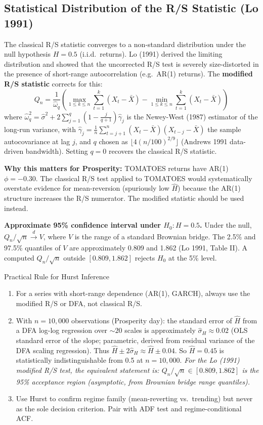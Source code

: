 \documentclass[12pt,a4paper,openany]{report}
\theoremstyle{definition}
\begin{document}
\subsection{Statistical Distribution of the R/S Statistic (Lo 1991)}

The classical R/S statistic converges to a non-standard distribution under the null hypothesis $H = 0.5$ (i.i.d.\ returns). Lo (1991) derived the limiting distribution and showed that the uncorrected R/S test is severely size-distorted in the presence of short-range autocorrelation (e.g.\ AR(1) returns). The \textbf{modified R/S statistic} corrects for this:
\[
  Q_n = \frac{1}{\hat{\omega}_q} \left(\max_{1 \leq k \leq n} \sum_{t=1}^k (X_t - \bar{X}) - \min_{1 \leq k \leq n} \sum_{t=1}^k (X_t - \bar{X})\right)
\]
where $\hat{\omega}_q^2 = \hat{\sigma}^2 + 2\sum_{j=1}^q \left(1 - \frac{j}{q+1}\right)\hat{\gamma}_j$ is the Newey-West (1987) estimator of the long-run variance, with $\hat{\gamma}_j = \frac{1}{n}\sum_{t=j+1}^n (X_t - \bar{X})(X_{t-j} - \bar{X})$ the sample autocovariance at lag $j$, and $q$ chosen as $\lfloor 4(n/100)^{2/9} \rfloor$ (Andrews 1991 data-driven bandwidth). Setting $q=0$ recovers the classical R/S statistic.

\textbf{Why this matters for Prosperity:} TOMATOES returns have AR(1) $\phi = -0.30$. The classical R/S test applied to TOMATOES would systematically overstate evidence for mean-reversion (spuriously low $\hat{H}$) because the AR(1) structure increases the R/S numerator. The modified statistic should be used instead.

\textbf{Approximate 95\% confidence interval under $H_0: H = 0.5$.}
Under the null, $Q_n / \sqrt{n} \xrightarrow{d} V$, where $V$ is the range of a standard Brownian bridge. The 2.5\% and 97.5\% quantiles of $V$ are approximately 0.809 and 1.862 (Lo 1991, Table II). A computed $Q_n / \sqrt{n}$ outside $[0.809, 1.862]$ rejects $H_0$ at the 5\% level.

\begin{keyconceptbox}{Practical Rule for Hurst Inference}
\begin{enumerate}[label=\arabic*.]
  \item For a series with short-range dependence (AR(1), GARCH), always use the modified R/S or DFA, not classical R/S.
  \item With $n = 10{,}000$ observations (Prosperity day): the standard error of $\hat{H}$ from a DFA log-log regression over $\sim 20$ scales is approximately $\hat{\sigma}_H \approx 0.02$ (OLS standard error of the slope; parametric, derived from residual variance of the DFA scaling regression). Thus $\hat{H} \pm 2\hat{\sigma}_H \approx \hat{H} \pm 0.04$. So $\hat{H} = 0.45$ is statistically indistinguishable from 0.5 at $n = 10{,}000$. \emph{For the Lo (1991) modified R/S test, the equivalent statement is: $Q_n/\sqrt{n} \in [0.809, 1.862]$ is the 95\% acceptance region (asymptotic, from Brownian bridge range quantiles).}
  \item Use Hurst to confirm regime family (mean-reverting vs.\ trending) but never as the sole decision criterion. Pair with ADF test and regime-conditional ACF.
\end{enumerate}
\end{keyconceptbox}
\end{document}
